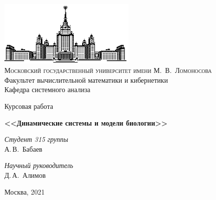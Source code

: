 \documentclass[11pt]{article}
\begin{document}
	
	\thispagestyle{empty}
	
	\begin{center}
		\ \vspace{-3cm}
		
		\includegraphics[width=0.5\textwidth]{msu.eps}\\
		{\scshape Московский государственный университет имени М.~В.~Ломоносова}\\
		Факультет вычислительной математики и кибернетики\\
		Кафедра системного анализа
		
		\vfill
		
		{\LARGE Курсовая работа}
		
		\vspace{1cm}
		
		{\Huge\bfseries <<Динамические системы и модели биологии>>}
	\end{center}
	
	\vspace{1cm}
	
	\begin{flushright}
		\large
		\textit{Студент 315 группы}\\
		А.\,В.~Бабаев
		
		\vspace{5mm}
		
		\textit{Научный руководитель}\\
		 Д.\,А.~Алимов
	\end{flushright}
	
	\vfill
	
	\begin{center}
		Москва, 2021
	\end{center}
	
\end{document}

